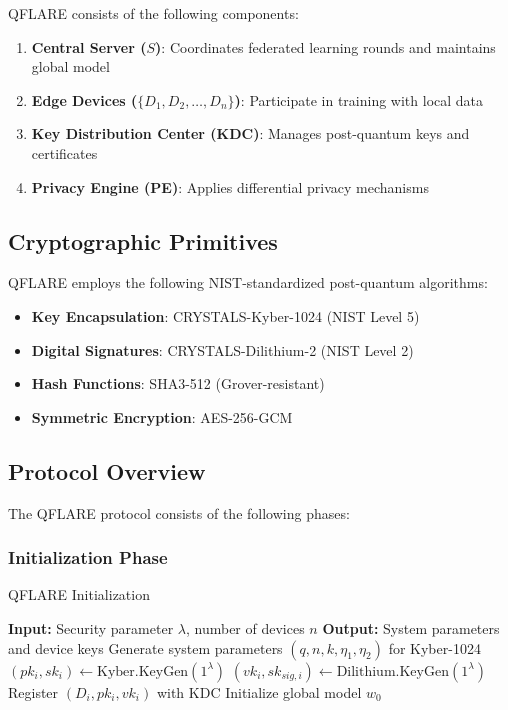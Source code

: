 \documentclass[journal]{IEEEtran}
\begin{document}
QFLARE consists of the following components:

\begin{enumerate}
\item \textbf{Central Server ($S$)}: Coordinates federated learning rounds and maintains global model
\item \textbf{Edge Devices ($\{D_1, D_2, \ldots, D_n\}$)}: Participate in training with local data
\item \textbf{Key Distribution Center (KDC)}: Manages post-quantum keys and certificates
\item \textbf{Privacy Engine (PE)}: Applies differential privacy mechanisms
\end{enumerate}

\subsection{Cryptographic Primitives}

QFLARE employs the following NIST-standardized post-quantum algorithms:

\begin{itemize}
\item \textbf{Key Encapsulation}: CRYSTALS-Kyber-1024 (NIST Level 5)
\item \textbf{Digital Signatures}: CRYSTALS-Dilithium-2 (NIST Level 2)  
\item \textbf{Hash Functions}: SHA3-512 (Grover-resistant)
\item \textbf{Symmetric Encryption}: AES-256-GCM
\end{itemize}

\subsection{Protocol Overview}

The QFLARE protocol consists of the following phases:

\subsubsection{Initialization Phase}
\begin{algorithm}
\caption{QFLARE Initialization}
\begin{algorithmic}[1]
\STATE \textbf{Input:} Security parameter $\lambda$, number of devices $n$
\STATE \textbf{Output:} System parameters and device keys
\STATE Generate system parameters $(q, n, k, \eta_1, \eta_2)$ for Kyber-1024
    \STATE $(pk_i, sk_i) \leftarrow \text{Kyber.KeyGen}(1^\lambda)$
    \STATE $(vk_i, sk_{sig,i}) \leftarrow \text{Dilithium.KeyGen}(1^\lambda)$
    \STATE Register $(D_i, pk_i, vk_i)$ with KDC
\ENDFOR
\STATE Initialize global model $w_0$
\end{algorithmic}
\end{algorithm}
\end{document}
